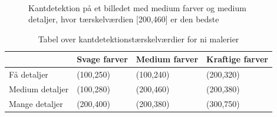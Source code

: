 \begin{figure}[!h]
    \centering
    \\

        \caption[]{Kantdetektion på et billedet med medium farver og medium detaljer, hvor tærskelværdien [200,460] er den bedste}
     \label{tre}
\end{figure}

\begin{table}[!h]
    \centering
    \begin{tabular}{| l | l | l | l |} \hline
        & Svage farver 	& Medium farver & Kraftige farver \\ \hline
        Få detaljer 		& (100,250)		& (100,240)		& (200,320)\\ \hline
        Medium detaljer 	& (100,280)		& (200,460)		& (200,380)\\ \hline
        Mange detaljer		& (200,400)		& (200,380)		& (300,750)\\ \hline
    \end{tabular}
    \caption{Tabel over kantdetektionstærskelværdier for ni malerier}
    \label{thressholdsTabelKant}
\end{table}

